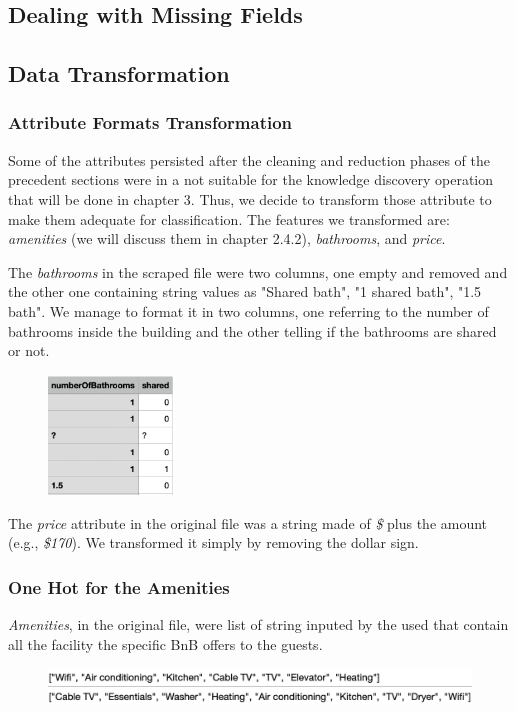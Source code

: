 \subsection{Dealing with Missing Fields}



\subsection{Data Transformation}

\subsubsection{Attribute Formats Transformation}
Some of the attributes persisted after the cleaning and reduction phases of the precedent sections were in a not suitable for the knowledge discovery operation that will be done in chapter 3. Thus, we decide to transform those attribute to make them adequate for classification. The features we transformed are: \textit{amenities} (we will discuss them in chapter 2.4.2), \textit{bathrooms}, and \textit{price}.

The \textit{bathrooms} in the scraped file were two columns, one empty and removed and the other one containing string values as "Shared bath", "1 shared bath", "1.5 bath". We manage to format it in two columns, one referring to the number of bathrooms inside the building and the other telling if the bathrooms are shared or not.
\begin{figure}[H]
	\centering
	\includegraphics[width=0.3\textwidth]{img/bath.png}  
\end{figure}

The \textit{price} attribute in the original file was a string made of \textit{\$} plus the amount (e.g., \textit{\$170}). We transformed it simply by removing the dollar sign.

\subsubsection{One Hot for the Amenities}
\textit{Amenities}, in the original file, were list of string inputed by the used that contain all the facility the specific BnB offers to the guests.
\begin{figure}[H]
	\centering
	\includegraphics[width=\textwidth]{img/amenities.png}  
\end{figure}

